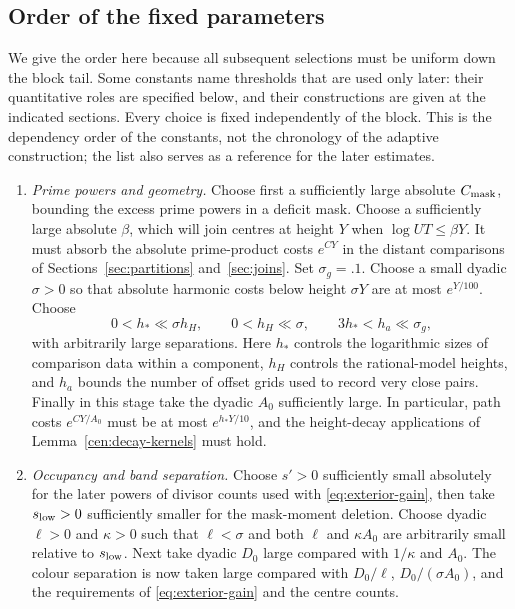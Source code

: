 \subsection{Order of the fixed parameters}
\label{cen:hierarchy}

We give the order here because all subsequent selections must be
uniform down the block tail. Some constants name thresholds that
are used only later: their quantitative roles are specified below,
and their constructions are given at the indicated sections. Every
choice is fixed independently of the block. This is the dependency
order of the constants, not the chronology of the adaptive construction;
the list also serves as a reference for the later estimates.

\begin{enumerate}
\item \emph{Prime powers and geometry.}
Choose first a sufficiently large absolute $C_{\rm mask}$, bounding
the excess prime powers in a deficit mask. Choose a sufficiently
large absolute $\beta$, which will join centres at height $Y$ when
$\log UT\le\beta Y$. It must absorb the absolute prime-product
costs $e^{CY}$ in the distant comparisons of
Sections~\ref{sec:partitions} and~\ref{sec:joins}.
Set $\sigma_g=.1$. Choose a small dyadic $\sigma>0$ so that absolute
harmonic costs below height $\sigma Y$ are at most $e^{Y/100}$.
Choose
\[
 0<h_*\ll\sigma h_H,\qquad 0<h_H\ll\sigma,
 \qquad 3h_*<h_a\ll\sigma_g,
\]
with arbitrarily large separations. Here $h_*$ controls the logarithmic
sizes of comparison data within a component, $h_H$ controls the
rational-model heights, and $h_a$ bounds the number of offset grids
used to record very close pairs. Finally in this stage take the
dyadic $A_0$ sufficiently large. In particular, path costs
$e^{CY/A_0}$ must be at most $e^{h_*Y/10}$, and the height-decay
applications of Lemma~\ref{cen:decay-kernels} must hold.

\item \emph{Occupancy and band separation.}
Choose $s'>0$ sufficiently small absolutely for the later powers
of divisor counts used with \eqref{eq:exterior-gain}, then take
$s_{\rm low}>0$ sufficiently smaller for the mask-moment deletion.
Choose dyadic $\ell>0$ and $\kappa>0$ such that $\ell<\sigma$ and
both $\ell$ and $\kappa A_0$ are arbitrarily small relative to
$s_{\rm low}$. Next take dyadic $D_0$ large compared with
$1/\kappa$ and $A_0$. The colour separation is now taken large
compared with $D_0/\ell$, $D_0/(\sigma A_0)$, and the requirements
of \eqref{eq:exterior-gain} and the centre counts.


\end{enumerate}
